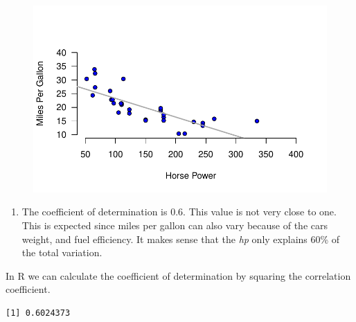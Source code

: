 \documentclass[
  letterpaper,
  DIV=11,
  numbers=noendperiod]{scrreprt}
\newenvironment{Shaded}{\begin{snugshade}}{\end{snugshade}}
\newcommand{\DecValTok}[1]{\textcolor[rgb]{0.68,0.00,0.00}{#1}}
\newcommand{\FunctionTok}[1]{\textcolor[rgb]{0.28,0.35,0.67}{#1}}
\newcommand{\NormalTok}[1]{\textcolor[rgb]{0.00,0.23,0.31}{#1}}
\newcommand{\SpecialCharTok}[1]{\textcolor[rgb]{0.37,0.37,0.37}{#1}}
\providecommand{\tightlist}{%
  \setlength{\itemsep}{0pt}\setlength{\parskip}{0pt}}\usepackage{longtable,booktabs,array}
\begin{document}
\begin{figure}[H]

{\centering \includegraphics{./07-RegressionI_files/figure-pdf/unnamed-chunk-14-1.pdf}

}

\end{figure}

\begin{blackbox}

\begin{enumerate}
\def\labelenumi{\arabic{enumi}.}
\setcounter{enumi}{2}
\tightlist
\item
  The coefficient of determination is \(0.6\). This value is not very
  close to one. This is expected since miles per gallon can also vary
  because of the cars weight, and fuel efficiency. It makes sense that
  the \emph{hp} only explains \(60\)\% of the total variation.
\end{enumerate}

\end{blackbox}

In R we can calculate the coefficient of determination by squaring the
correlation coefficient.

\begin{Shaded}
\end{Shaded}

\begin{verbatim}
[1] 0.6024373
\end{verbatim}
\end{document}
